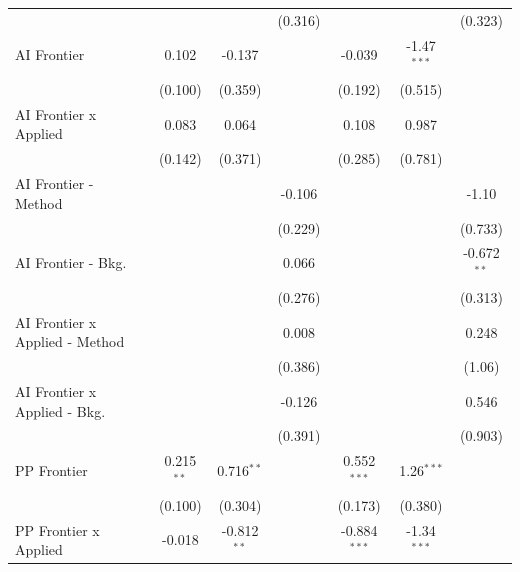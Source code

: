 \begin{tabular}{lcccccc}
                                  &               &               & (0.316)       &                &               & (0.323)\\   
   AI Frontier                    & 0.102         & -0.137        &               & -0.039         & -1.47$^{***}$ &   \\   
                                  & (0.100)       & (0.359)       &               & (0.192)        & (0.515)       &   \\   
   AI Frontier x Applied          & 0.083         & 0.064         &               & 0.108          & 0.987         &   \\   
                                  & (0.142)       & (0.371)       &               & (0.285)        & (0.781)       &   \\   
   AI Frontier - Method           &               &               & -0.106        &                &               & -1.10\\   
                                  &               &               & (0.229)       &                &               & (0.733)\\   
   AI Frontier - Bkg.             &               &               & 0.066         &                &               & -0.672$^{**}$\\   
                                  &               &               & (0.276)       &                &               & (0.313)\\   
   AI Frontier x Applied - Method &               &               & 0.008         &                &               & 0.248\\   
                                  &               &               & (0.386)       &                &               & (1.06)\\   
   AI Frontier x Applied - Bkg.   &               &               & -0.126        &                &               & 0.546\\   
                                  &               &               & (0.391)       &                &               & (0.903)\\   
   PP Frontier                    & 0.215$^{**}$  & 0.716$^{**}$  &               & 0.552$^{***}$  & 1.26$^{***}$  &   \\   
                                  & (0.100)       & (0.304)       &               & (0.173)        & (0.380)       &   \\   
   PP Frontier x Applied          & -0.018        & -0.812$^{**}$ &               & -0.884$^{***}$ & -1.34$^{***}$ &   \\   

\end{tabular}
